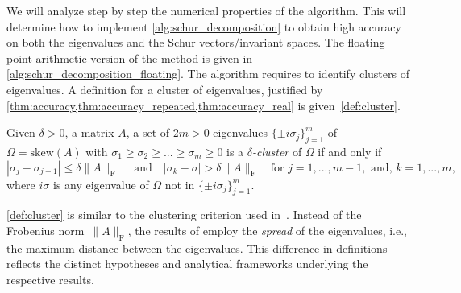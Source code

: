 \documentclass[10pt,twoside,dvipsnames]{siamart1116}
\numberwithin{algorithm}{section}
\numberwithin{equation}{section}
\newcommand{\new}[1]{#1}
\begin{document}
We will analyze step by step the numerical properties of the algorithm. This will determine how to implement \cref{alg:schur_decomposition} to obtain high accuracy on both the eigenvalues and the Schur vectors/invariant spaces. The floating point arithmetic version of the method is  given in  \cref{alg:schur_decomposition_floating}. \new{The algorithm requires to identify clusters of eigenvalues. A definition for a cluster of eigenvalues, justified by \cref{thm:accuracy,thm:accuracy_repeated,thm:accuracy_real} is given~\cref{def:cluster}.
\begin{definition}\label{def:cluster}
Given $\delta>0$, a matrix $A$, a set of $2m>0$ eigenvalues $\{\pm i\sigma_j\}_{j=1}^{m}$ of $\Omega =\mathrm{skew}(A)$ with $\sigma_1\geq \sigma_2\geq...\geq \sigma_m\geq0$ 
is a \emph{$\delta$-cluster} of $\Omega$ if and only if
	\begin{equation*}
		|\sigma_j - \sigma_{j+1}|\leq \delta \|A\|_\mathrm{F}\quad \text{ and}\quad |\sigma_k - \sigma|> \delta \|A\|_\mathrm{F}\quad \text{for } j=1,...,m-1, \text{ and, } k=1,...,m,
	\end{equation*}
	where $i\sigma$ is any eigenvalue of $\Omega$ not in $\{\pm i\sigma_j\}_{j=1}^m$.
\end{definition}
\cref{def:cluster} is similar to the clustering criterion used in~\cite[Alg.~2]{Sutton23}. Instead of the Frobenius norm~$\|A\|_\mathrm{F}$, the results of \cite{Sutton23} employ the \emph{spread} of the eigenvalues, i.e., the maximum distance between the eigenvalues. This difference in definitions reflects the distinct hypotheses and analytical frameworks underlying the respective results.}
\end{document}
